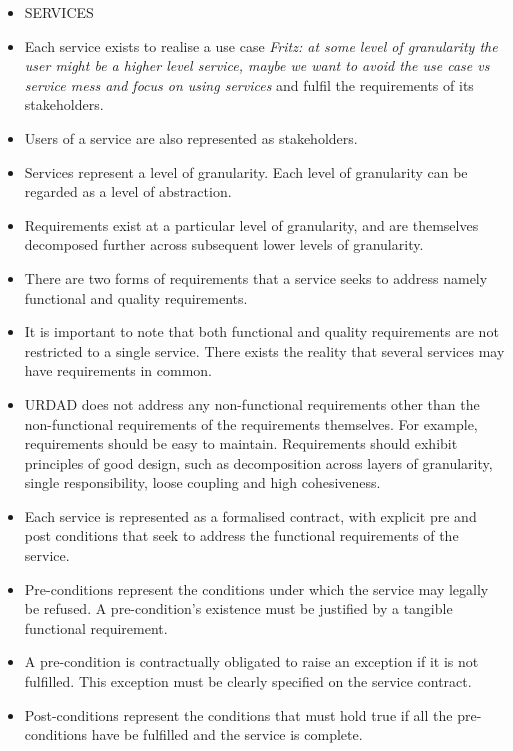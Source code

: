 \begin{itemize}
\begin{itemize}
\begin{itemize}
					
				\item SERVICES
					\item Each service exists to realise a use case 
{\em Fritz: at some level of granularity the user might be a higher level service, maybe we want to avoid the use case vs service mess and focus on using services} and fulfil the requirements of its stakeholders.
					\item Users of a service are also represented as stakeholders.
					\item Services represent a level of granularity. Each level of granularity can be regarded as a level of abstraction.
					\item Requirements exist at a particular level of granularity, and are themselves decomposed further across subsequent lower levels of granularity.
					\item There are two forms of requirements that a service seeks to address namely functional and quality requirements.
					\item It is important to note that both functional and quality requirements are not restricted to a single service. There exists the reality that several services may have requirements in common.
					\item URDAD does not address any non-functional requirements other than the non-functional requirements of the requirements themselves. For example, requirements should be easy to maintain. Requirements should exhibit principles of good design, such as decomposition across layers of granularity, single responsibility, loose coupling and high cohesiveness.
					\item Each service is represented as a formalised contract, with explicit pre and post conditions that seek to address the functional requirements of the service.
					\item Pre-conditions represent the conditions under which the service may legally be refused. A pre-condition's existence must be justified by a tangible functional requirement. 
					\item A pre-condition is contractually obligated to raise an exception if it is not fulfilled. This exception must be clearly specified on the service contract.
					\item Post-conditions represent the conditions that must hold true if all the pre-conditions have be fulfilled and the service is complete.
			
			
			

\end{itemize}
\end{itemize}
\end{itemize}
